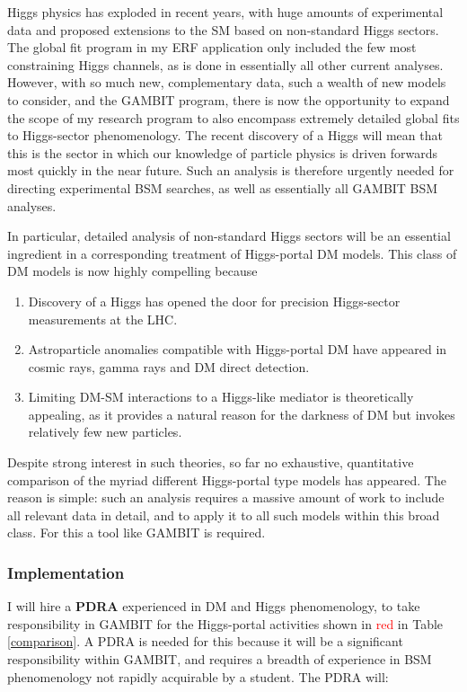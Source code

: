 \documentclass[11pt,oneside,twocolumn,a4paper]{article}
\begin{document}
Higgs physics has exploded in recent years, with huge amounts of experimental data and proposed extensions to the SM based on non-standard Higgs sectors.  The global fit program in my ERF application only included the few most constraining Higgs channels, as is done in essentially all other current analyses.  However, with so much new, complementary data, such a wealth of new models to consider, and the GAMBIT program, there is now the opportunity to expand the scope of my research program to also encompass extremely detailed global fits to Higgs-sector phenomenology.  The recent discovery of a Higgs will mean that this is the sector in which our knowledge of particle physics is driven forwards most quickly in the near future.  Such an analysis is therefore urgently needed for directing experimental BSM searches, as well as essentially all GAMBIT BSM analyses.

In particular, detailed analysis of non-standard Higgs sectors will be an essential ingredient in a corresponding treatment of Higgs-portal DM models.  This class of DM models is now highly compelling because\begin{enumerate}\setlength{\itemsep}{2pt}
\item Discovery of a Higgs has opened the door for precision Higgs-sector measurements at the LHC.
\item Astroparticle anomalies compatible with Higgs-portal DM have appeared in cosmic rays, gamma rays and DM direct detection.
\item Limiting DM-SM interactions to a Higgs-like mediator is theoretically appealing, as it provides a natural reason for the darkness of DM but invokes relatively few new particles.\end{enumerate}  Despite strong interest in such theories, so far no exhaustive, quantitative comparison of the myriad different Higgs-portal type models has appeared.  The reason is simple: such an analysis requires a massive amount of work to include all relevant data in detail, and to apply it to all such models within this broad class.  For this a tool like GAMBIT is required.


\subsubsection*{Implementation}

I will hire a \textbf{PDRA} experienced in DM and Higgs phenomenology, to take responsibility in GAMBIT for the Higgs-portal activities shown in \textcolor{red}{red} in Table \ref{comparison}.  A PDRA is needed for this because it will be a significant responsibility within GAMBIT, and requires a breadth of experience in BSM phenomenology not rapidly acquirable by a student.  The PDRA will:
\end{document}
